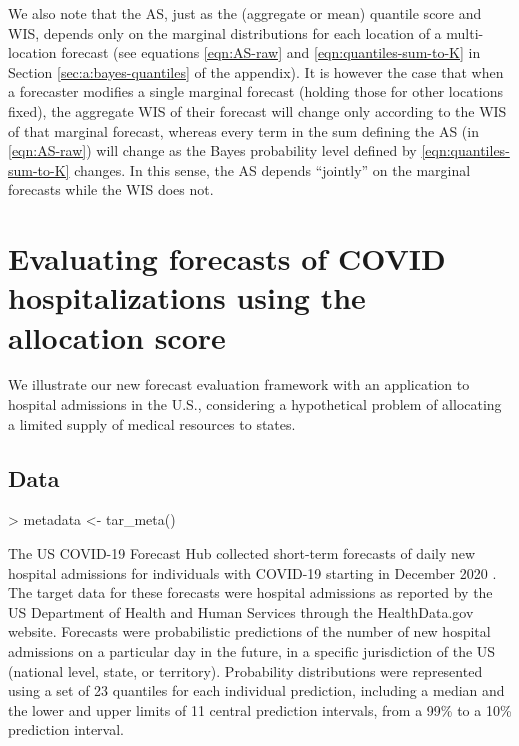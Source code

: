 \documentclass{article}
\begin{document}
We also note that the AS, just as the (aggregate or mean) quantile score and WIS, depends only on the marginal distributions for each location of a multi-location forecast (see equations \eqref{eqn:AS-raw} and \eqref{eqn:quantiles-sum-to-K} in Section \ref{sec:a:bayes-quantiles} of the appendix). It is however the case that when a forecaster modifies a single marginal forecast (holding those for other locations fixed), the aggregate WIS of their forecast will change only according to the WIS of that marginal forecast, whereas every term in the sum defining the AS (in \eqref{eqn:AS-raw}) will change as the Bayes probability level defined by \eqref{eqn:quantiles-sum-to-K} changes.  In this sense, the AS depends “jointly” on the marginal forecasts while the WIS does not.

\section{Evaluating forecasts of COVID hospitalizations using the allocation score}
\label{sec:application}

We illustrate our new forecast evaluation framework with an application to hospital admissions in the U.S., considering
a hypothetical problem of allocating a limited supply of medical resources to states.

\subsection{Data}
\begin{Schunk}
\begin{Sinput}
> metadata <- tar_meta()
\end{Sinput}
\end{Schunk}

The US COVID-19 Forecast Hub collected short-term forecasts of daily new hospital admissions for individuals with
COVID-19 starting in December 2020 \citep{cramer_united_2022}. The target data for these forecasts were hospital
admissions as reported by the US Department of Health and Human Services through the HealthData.gov website. Forecasts
were probabilistic predictions of the number of new hospital admissions on a particular day in the future, in a specific
jurisdiction of the US (national level, state, or territory). Probability distributions were represented using a set of
23 quantiles for each individual prediction, including a median and the lower and upper limits of 11 central prediction
intervals, from a 99\% to a 10\% prediction interval.
\end{document}

